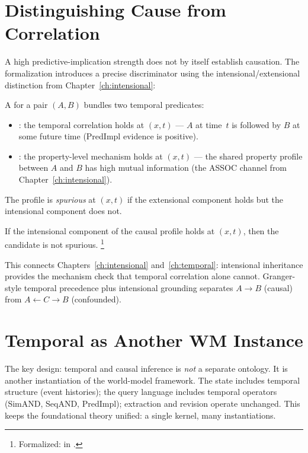 \documentclass[11pt,openany]{report}
\begin{document}
\section{Distinguishing Cause from Correlation}

A high predictive-implication strength does not by itself establish
causation.  The formalization introduces a precise discriminator
using the intensional/extensional distinction from
Chapter~\ref{ch:intensional}:

\begin{definition}
A  for a pair $(A, B)$ bundles two
temporal predicates:
\begin{itemize}
\item {}: the temporal correlation holds at $(x, t)$
  --- $A$ at time~$t$ is followed by $B$ at some future time
  (PredImpl evidence is positive).
\item {}: the property-level mechanism holds at
  $(x, t)$ --- the shared property profile between $A$ and $B$
  has high mutual information (the ASSOC channel from
  Chapter~\ref{ch:intensional}).
\end{itemize}
The profile is \emph{spurious} at $(x, t)$ if the extensional
component holds but the intensional component does not.
\end{definition}

\begin{theorem}
\label{thm:not-spurious}
If the intensional component of the causal profile holds at $(x, t)$,
then the candidate is not spurious.%
\footnote{Formalized:
 in
.}
\end{theorem}

\noindent
This connects Chapters~\ref{ch:intensional} and~\ref{ch:temporal}:
intensional inheritance provides the mechanism check that temporal
correlation alone cannot.  Granger-style temporal precedence plus
intensional grounding separates $A \to B$ (causal) from
$A \leftarrow C \to B$ (confounded).


\section{Temporal as Another WM Instance}

The key design: temporal and causal inference is \emph{not} a
separate ontology.  It is another instantiation of the world-model
framework.  The state includes temporal structure (event histories);
the query language includes temporal operators (SimAND, SeqAND,
PredImpl); extraction and revision operate unchanged.  This keeps
the foundational theory unified: a single kernel, many
instantiations.
\end{document}
